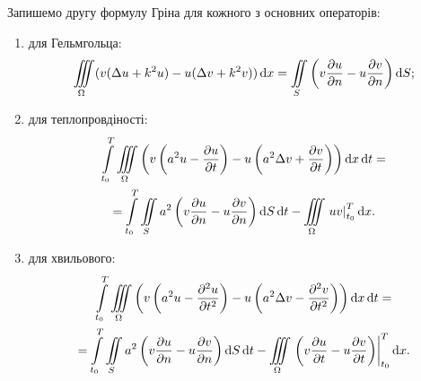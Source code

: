 Запишемо другу формулу Гріна для кожного з основних операторів:
\begin{enumerate}
    \item для Гельмгольца: 
    \begin{equation}
        \displaystyle\iiint\limits_\Omega ( v (\Delta u + k^2 u) - u (\Delta v + k^2 v)) \mathop{}\!\mathrm{d} x = \displaystyle\iint\limits_S \left( v \frac{\partial u}{\partial n} - u \frac{\partial v}{\partial n} \right) \mathop{}\!\mathrm{d} S;
    \end{equation}
    \item для теплопровдіності:
    \begin{multline}
        \displaystyle\int\limits_{t_0}^T \displaystyle\iiint\limits_\Omega \left( v \left( a^2 u - \frac{\partial u}{\partial t} \right) - u \left( a^2 \Delta v + \frac{\partial v}{\partial t} \right) \right) \mathop{}\!\mathrm{d} x \mathop{}\!\mathrm{d} t = \\
        = \displaystyle\int\limits_{t_0}^T \displaystyle\iint\limits_S a^2 \left( v \frac{\partial u}{\partial n} - u \frac{\partial v}{\partial n} \right) \mathop{}\!\mathrm{d} S \mathop{}\!\mathrm{d} t- \displaystyle\iiint\limits_\Omega \left. u v \right|_{t_0}^T \mathop{}\!\mathrm{d} x.
    \end{multline}
    \item для хвильового:
    \begin{multline}
        \displaystyle\int\limits_{t_0}^T \displaystyle\iiint\limits_\Omega \left( v \left( a^2 u - \frac{\partial^2 u}{\partial t^2} \right) - u \left( a^2 \Delta v - \frac{\partial^2 v}{\partial t^2} \right) \right) \mathop{}\!\mathrm{d} x \mathop{}\!\mathrm{d} t = \\
        = \displaystyle\int\limits_{t_0}^T \displaystyle\iint\limits_S a^2 \left( v \frac{\partial u}{\partial n} - u \frac{\partial v}{\partial n} \right) \mathop{}\!\mathrm{d} S \mathop{}\!\mathrm{d} t - \displaystyle\iiint\limits_\Omega \left. \left( v \frac{\partial u}{\partial t} - u \frac{\partial v}{\partial t} \right) \right|_{t_0}^T \mathop{}\!\mathrm{d} x.
    \end{multline}
\end{enumerate}

